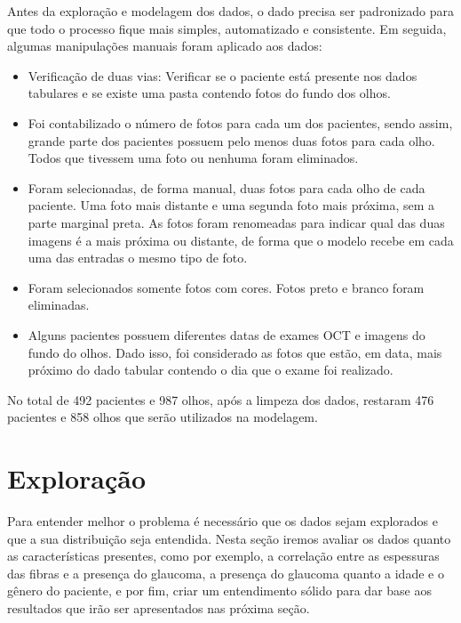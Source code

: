\documentclass[ %
	msc, %
	portugues %
]{../ppgccufmg}
\begin{document}
    Antes da exploração e modelagem dos dados, o dado precisa ser padronizado para que todo o processo fique mais
    simples, automatizado e consistente. Em seguida, algumas manipulações manuais foram aplicado aos dados:
    \begin{itemize}
        \item Verificação de duas vias: Verificar se o paciente está presente nos dados tabulares
            e se existe uma pasta contendo fotos do fundo dos olhos.
        \item Foi contabilizado o número de fotos para cada um dos pacientes, sendo assim, grande
            parte dos pacientes possuem pelo menos duas fotos para cada olho. Todos que tivessem uma
            foto ou nenhuma foram eliminados.
        \item Foram selecionadas, de forma manual, duas fotos para cada olho de cada paciente. Uma foto
            mais distante e uma segunda foto mais próxima, sem a parte marginal preta.
            As fotos foram renomeadas para indicar qual das duas imagens é a mais próxima ou
            distante, de forma que o modelo recebe em cada uma das entradas o mesmo tipo de foto.
        \item Foram selecionados somente fotos com cores. Fotos preto e branco foram eliminadas.
        \item Alguns pacientes possuem diferentes datas de exames OCT e imagens do fundo do olhos.
            Dado isso, foi considerado as fotos que estão, em data, mais próximo do dado tabular
            contendo o dia que o exame foi realizado.
    \end{itemize}

    No total de 492 pacientes e 987 olhos, após a limpeza dos dados, restaram 476
    pacientes e 858 olhos que serão utilizados na modelagem.

    \section{Exploração}

    Para entender melhor o problema é necessário que os dados sejam explorados e que a sua
    distribuição seja entendida. Nesta seção iremos avaliar os dados quanto as características
    presentes, como por exemplo, a correlação entre as espessuras das fibras e a presença do
    glaucoma, a presença do glaucoma quanto a idade e o gênero do paciente, e por fim, criar um
    entendimento sólido para dar base aos resultados que irão ser apresentados nas próxima seção.
\end{document}
